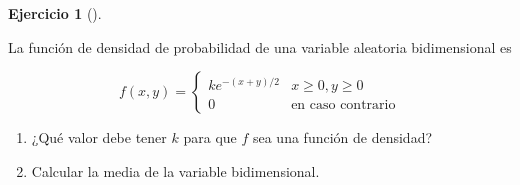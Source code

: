 \documentclass[
  a4paper,
]{scrreport}
\theoremstyle{definition}
\newtheorem{exercise}{Ejercicio}[chapter]
\theoremstyle{remark}
\begin{document}
\begin{exercise}[]\protect\hypertarget{exr-funcion-densidad-exponencial-exponencial}{}\label{exr-funcion-densidad-exponencial-exponencial}

La función de densidad de probabilidad de una variable aleatoria
bidimensional es

\[
f(x,y) = 
\begin{cases}
ke^{-(x+y)/2} & x\geq 0, y\geq 0\\
0 & \mbox{en caso contrario}
\end{cases}
\]

\begin{enumerate}
\def\labelenumi{\alph{enumi}.}
\item
  ¿Qué valor debe tener \(k\) para que \(f\) sea una función de
  densidad?
\item
  Calcular la media de la variable bidimensional.
\end{enumerate}

\end{exercise}
\end{document}
